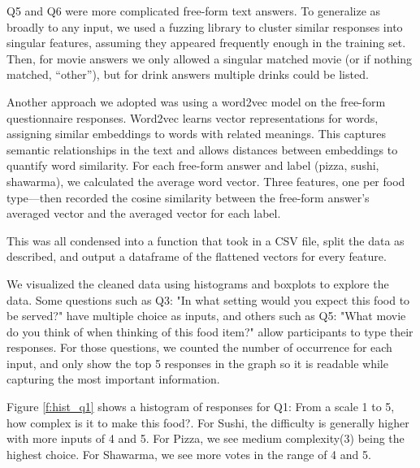 Q5 and Q6 were more complicated free-form text answers. To generalize as broadly to any input, we used a fuzzing library to cluster similar responses into singular features, assuming they appeared frequently enough in the training set. Then, for movie answers we only allowed a singular matched movie (or if nothing matched, “other”), but for drink answers multiple drinks could be listed.

Another approach we adopted was using a word2vec model on the free-form questionnaire responses. Word2vec learns vector representations for words, assigning similar embeddings to words with related meanings. This captures semantic relationships in the text and allows distances between embeddings to quantify word similarity. For each free-form answer and label (pizza, sushi, shawarma), we calculated the average word vector. Three features, one per food type—then recorded the cosine similarity between the free-form answer’s averaged vector and the averaged vector for each label.

This was all condensed into a function that took in a CSV file, split the data as described, and output a dataframe of the flattened vectors for every feature.

We visualized the cleaned data using histograms and boxplots to explore the data. Some questions such as Q3: "In what setting 
would you expect this food to be served?" have multiple choice as inputs, and others such as Q5: "What movie do you think of when thinking of this food item?"
allow participants to type their responses. For those questions, we counted the number of occurrence for each input, and only show the top 5 responses in the graph 
so it is readable while capturing the most important information.

Figure \ref{f:hist_q1} shows a histogram of responses for Q1: From a scale 1 to 5, how complex is it to make this food?. For Sushi, 
the difficulty is generally higher with more inputs of 4 and 5. For Pizza, we see medium complexity(3) being the highest choice. For Shawarma,
we see more votes in the range of 4 and 5.

